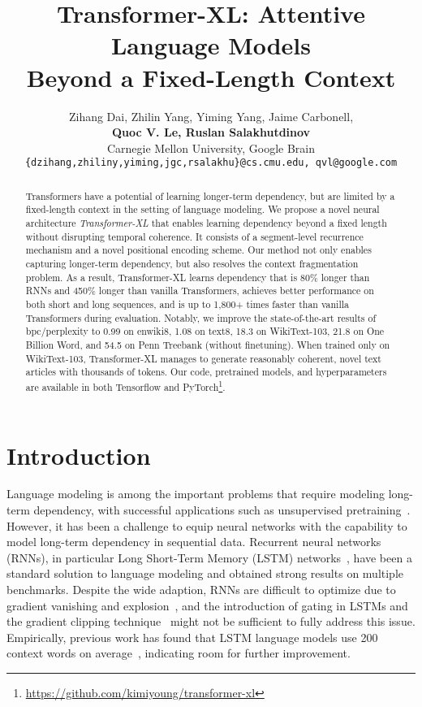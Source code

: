 \documentclass[11pt,a4paper]{article}
\title{Transformer-XL: Attentive Language Models \\ Beyond a Fixed-Length Context}
\author{Zihang Dai, Zhilin Yang, Yiming Yang, Jaime Carbonell, \\
	{\bf Quoc V. Le, Ruslan Salakhutdinov }\\
	Carnegie Mellon University, Google Brain \\
	{\small \texttt{\{dzihang,zhiliny,yiming,jgc,rsalakhu\}@cs.cmu.edu, qvl@google.com} } 
}
\date{}
\begin{document}
\maketitle


\renewcommand{\thefootnote}{\fnsymbol{footnote}}
\renewcommand{\thefootnote}{\arabic{footnote}}

\begin{abstract}

Transformers have a potential of learning longer-term dependency, but are limited by a fixed-length context in the setting of language modeling.
We propose a novel neural architecture \textit{Transformer-XL} that enables learning dependency beyond a fixed length without disrupting temporal coherence. It consists of a segment-level recurrence mechanism and a novel positional encoding scheme. Our method not only enables capturing longer-term dependency, but also resolves the context fragmentation problem. As a result, Transformer-XL learns dependency that is 80\% longer than RNNs and 450\% longer than vanilla Transformers, achieves better performance on both short and long sequences, and is up to 1,800+ times faster than vanilla Transformers during evaluation.
Notably, we improve the state-of-the-art results of bpc/perplexity to 0.99 on enwiki8, 1.08 on text8, 18.3 on WikiText-103, 21.8 on One Billion Word, and 54.5 on Penn Treebank (without finetuning).
When trained only on WikiText-103, Transformer-XL manages to generate reasonably coherent, novel text articles with thousands of tokens.
Our code, pretrained models, and hyperparameters are available in both Tensorflow and PyTorch\footnote{\url{https://github.com/kimiyoung/transformer-xl}}.










\end{abstract} \section{Introduction}
\label{sec:intro}

Language modeling is among the important problems that require modeling long-term dependency, with successful applications such as unsupervised pretraining~\citep{dai2015semi,peters2018deep,radford2018improving,devlin2018bert}.
However, it has been a challenge to equip neural networks with the capability to model long-term dependency in sequential data.
Recurrent neural networks (RNNs), in particular Long Short-Term Memory (LSTM) networks~\citep{hochreiter1997long}, have been a standard solution to language modeling and obtained strong results on multiple benchmarks.
Despite the wide adaption, RNNs are difficult to optimize due to gradient vanishing and explosion~\citep{hochreiter2001gradient}, and the introduction of gating in LSTMs and the gradient clipping technique~\citep{graves2013generating} might not be sufficient to fully address this issue.
Empirically, previous work has found that LSTM language models use 200 context words on average~\citep{khandelwal2018sharp}, indicating room for further improvement.
\end{document}
